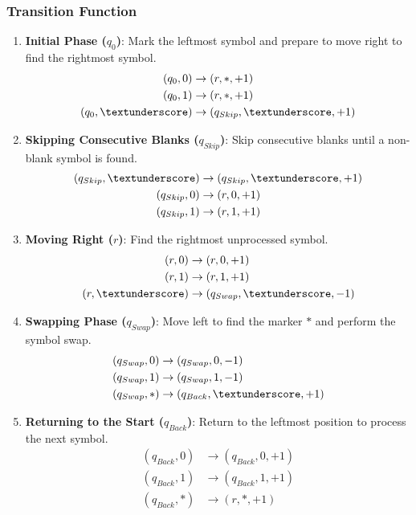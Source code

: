 \documentclass[a4paper]{article}
\begin{document}
\subsubsection{Transition Function}

\begin{enumerate}
    \item \textbf{Initial Phase (\( q_0 \))}: Mark the leftmost symbol and prepare to move right to find the rightmost symbol.
    \begin{align*}
        (q_0, 0) &\rightarrow (r, *, +1) \\
        (q_0, 1) &\rightarrow (r, *, +1) \\
        (q_0, \textunderscore) &\rightarrow (q_{Skip}, \textunderscore, +1)
    \end{align*}

    \item \textbf{Skipping Consecutive Blanks (\( q_{Skip} \))}: Skip consecutive blanks until a non-blank symbol is found.
    \begin{align*}
        (q_{Skip}, \textunderscore) &\rightarrow (q_{Skip}, \textunderscore, +1) \\
        (q_{Skip}, 0) &\rightarrow (r, 0, +1) \\
        (q_{Skip}, 1) &\rightarrow (r, 1, +1)
    \end{align*}

    \item \textbf{Moving Right (\( r \))}: Find the rightmost unprocessed symbol.
    \begin{align*}
        (r, 0) &\rightarrow (r, 0, +1) \\
        (r, 1) &\rightarrow (r, 1, +1) \\
        (r, \textunderscore) &\rightarrow (q_{Swap}, \textunderscore, -1)
    \end{align*}

    \item \textbf{Swapping Phase (\( q_{Swap} \))}: Move left to find the marker \(*\) and perform the symbol swap.
    \begin{align*}
        (q_{Swap}, 0) &\rightarrow (q_{Swap}, 0, -1) \\
        (q_{Swap}, 1) &\rightarrow (q_{Swap}, 1, -1) \\
        (q_{Swap}, *) &\rightarrow (q_{Back}, \textunderscore, +1)
    \end{align*}

    \item \textbf{Returning to the Start (\( q_{Back} \))}: Return to the leftmost position to process the next symbol.
    \begin{align*}
        (q_{Back}, 0) &\rightarrow (q_{Back}, 0, +1) \\
        (q_{Back}, 1) &\rightarrow (q_{Back}, 1, +1) \\
        (q_{Back}, *) &\rightarrow (r, *, +1)
    \end{align*}


\end{enumerate}
\end{document}
